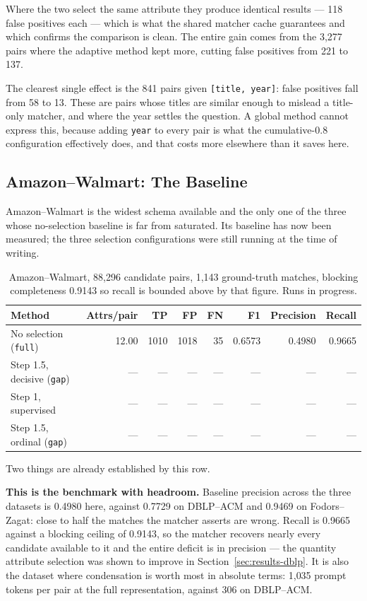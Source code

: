 \documentclass[11pt]{article}
\begin{document}
Where the two select the same attribute they produce identical results --- 118 false
positives each --- which is what the shared matcher cache guarantees and which confirms the
comparison is clean. The entire gain comes from the 3{,}277 pairs where the adaptive method
kept more, cutting false positives from 221 to 137.

The clearest single effect is the 841 pairs given \texttt{[title, year]}: false positives
fall from 58 to 13. These are pairs whose titles are similar enough to mislead a
title-only matcher, and where the year settles the question. A global method cannot express
this, because adding \texttt{year} to every pair is what the cumulative-0.8 configuration
effectively does, and that costs more elsewhere than it saves here.

\subsection{Amazon--Walmart: The Baseline}
\label{sec:amazon}

Amazon--Walmart is the widest schema available and the only one of the three whose
no-selection baseline is far from saturated. Its baseline has now been measured; the three
selection configurations were still running at the time of writing.

\begin{table}[h]
\centering
\begin{tabular}{lrrrrrrr}
\toprule
Method & Attrs/pair & TP & FP & FN & F1 & Precision & Recall \\
\midrule
No selection (\texttt{full}) & 12.00 & 1010 & 1018 & 35 & 0.6573 & 0.4980 & 0.9665 \\
Step 1.5, decisive (\texttt{gap}) & --- & --- & --- & --- & --- & --- & --- \\
Step 1, supervised & --- & --- & --- & --- & --- & --- & --- \\
Step 1.5, ordinal (\texttt{gap}) & --- & --- & --- & --- & --- & --- & --- \\
\bottomrule
\end{tabular}
\caption{Amazon--Walmart, 88{,}296 candidate pairs, 1{,}143 ground-truth matches, blocking
completeness 0.9143 so recall is bounded above by that figure. Runs in progress.}
\end{table}

Two things are already established by this row.

\textbf{This is the benchmark with headroom.} Baseline precision across the three datasets
is 0.4980 here, against 0.7729 on DBLP--ACM and 0.9469 on Fodors--Zagat: close to half the
matches the matcher asserts are wrong. Recall is 0.9665 against a blocking ceiling of
0.9143, so the matcher recovers nearly every candidate available to it and the entire
deficit is in precision --- the quantity attribute selection was shown to improve in
Section~\ref{sec:results-dblp}. It is also the dataset where condensation is worth most in
absolute terms: 1{,}035 prompt tokens per pair at the full representation, against 306 on
DBLP--ACM.
\end{document}
